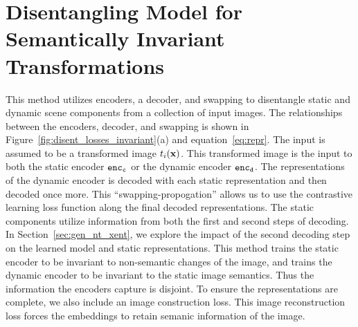 \documentclass[11pt]{article}
\begin{document}
\section{Disentangling Model for Semantically Invariant Transformations}

This method utilizes encoders, a decoder, and swapping to disentangle static and dynamic scene components from a collection of input images. The relationships between the encoders, decoder, and swapping is shown in Figure~\ref{fig:disent_losses_invariant}(a) and equation~\ref{eq:repr}. The input is assumed to be a transformed image $t_i(\boldsymbol{\mathrm{x}})$. This transformed image is the input to both the static encoder ${\tt enc_{c}}$ or the dynamic encoder ${\tt enc_{d}}$. The representations of the dynamic encoder is decoded with each static representation and then decoded once more. This ``swapping-propogation'' allows us to use the contrastive learning loss function along the final decoded representations. The static components utilize information from both the first and second steps of decoding. In Section~\ref{sec:gen_nt_xent}, we explore the impact of the second decoding step on the learned model and static representations. This method trains the static encoder to be invariant to non-semantic changes of the image, and trains the dynamic encoder to be invariant to the static image semantics. Thus the information the encoders capture is disjoint. To ensure the representations are complete, we also include an image construction loss. This image reconstruction loss forces the embeddings to retain semanic information of the image.
\end{document}
